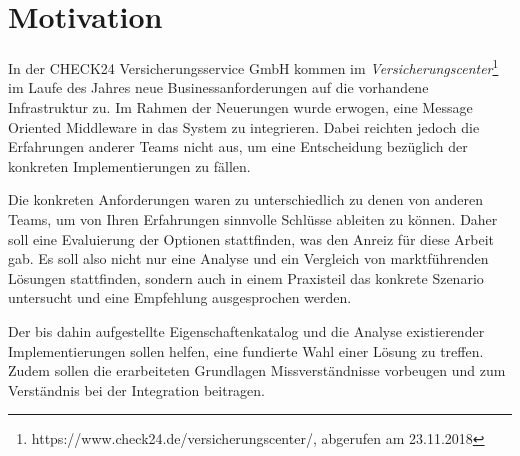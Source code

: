 \section{Motivation}
\label{intro:motivation}
In der CHECK24 Versicherungsservice GmbH kommen im 
\textit{Versicherungscenter}\footnote{https://www.check24.de/versicherungscenter/,
abgerufen am 23.11.2018} im Laufe des Jahres neue Businessanforderungen auf die
vorhandene Infrastruktur zu. Im Rahmen der Neuerungen wurde erwogen, eine
Message Oriented Middleware in das System zu integrieren. Dabei reichten jedoch
die Erfahrungen anderer Teams nicht aus, um eine Entscheidung bezüglich der
konkreten Implementierungen zu fällen.

Die konkreten Anforderungen waren zu unterschiedlich zu denen von anderen Teams, um
von Ihren Erfahrungen sinnvolle Schlüsse ableiten zu können. Daher soll eine
Evaluierung der Optionen stattfinden, was den Anreiz für diese Arbeit gab. Es soll
also nicht nur eine Analyse und ein Vergleich von marktführenden
Lösungen stattfinden, sondern auch in einem Praxisteil das konkrete Szenario
untersucht und eine Empfehlung ausgesprochen werden.

Der bis dahin aufgestellte Eigenschaftenkatalog und die Analyse existierender
Implementierungen sollen helfen, eine fundierte Wahl einer Lösung zu treffen. Zudem
sollen die erarbeiteten Grundlagen Missverständnisse vorbeugen und zum Verständnis
bei der Integration beitragen.
